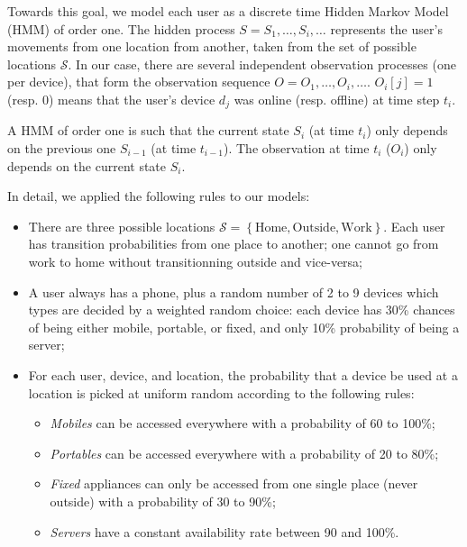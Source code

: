 Towards this goal, we model each user as a discrete time Hidden Markov Model (HMM) of order one. 
The hidden process $S=S_1, \dots, S_i, \dots$ represents the user's movements from one location from another, 
taken from the set of possible locations $\mathcal{S}$.
In our case, there are several independent observation processes (one per device), 
that form the observation sequence $O= O_1, \dots, O_i, \dots$.
$O_i[j]=1$ (resp. 0) means that the user's device $d_j$ was online (resp. offline) at time step $t_i$.

A HMM of order one is such that the current state $S_i$ (at time $t_i$) only depends on the previous one $S_{i-1}$ (at time $t_{i-1}$).
The observation at time $t_i$ ($O_i$) only depends on the current state $S_i$.



In detail, we applied the following rules to our models: 
\begin{itemize}
  \item There are three possible locations $\mathcal{S}=\left\{\text{Home}, \text{Outside}, \text{Work}\right\}$.
  Each user has transition probabilities from one place to another;
  one cannot go from work to home without transitionning outside and vice-versa;
  \item A user always has a phone, plus a random number of 2 to 9 devices which types are decided by a weighted random choice: each device has 30\% chances of being either mobile, portable, or fixed, and only 10\% probability of being a server;
  \item For each user, device, and location, the probability that a device be used at a location is picked at uniform random according to the following rules:
  \begin{itemize}
    \item \emph{Mobiles} can be accessed everywhere with a probability of 60 to 100\%;
    \item \emph{Portables} can be accessed everywhere with a probability of 20 to 80\%;
    \item \emph{Fixed} appliances can only be accessed from one single place (never outside) with a probability of 30 to 90\%;
    \item \emph{Servers} have a constant availability rate between 90 and 100\%.
  \end{itemize}
\end{itemize}

